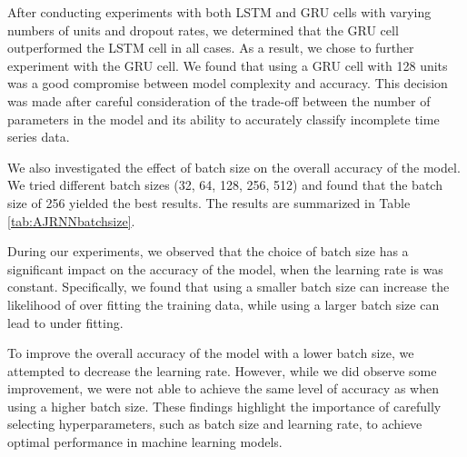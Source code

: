 After conducting experiments with both LSTM and GRU cells with varying numbers of units and dropout rates, we determined that the GRU cell outperformed the LSTM cell in all cases.
As a result, we chose to further experiment with the GRU cell. 
We found that using a GRU cell with 128 units was a good compromise between model complexity and accuracy. 
This decision was made after careful consideration of the trade-off between the number of parameters in the model and its ability to accurately classify incomplete time series data.

We also investigated the effect of batch size on the overall accuracy of the model.
We tried different batch sizes (32, 64, 128, 256, 512) and found that the batch size of 256 yielded the best results.
The results are summarized in Table \ref{tab:AJRNNbatchsize}.

During our experiments, we observed that the choice of batch size has a significant impact on the accuracy of the model, when the learning rate is was constant.
Specifically, we found that using a smaller batch size can increase the likelihood of over fitting the training data, while using a larger batch size can lead to under fitting.

To improve the overall accuracy of the model with a lower batch size, we attempted to decrease the learning rate.
However, while we did observe some improvement, we were not able to achieve the same level of accuracy as when using a higher batch size.
These findings highlight the importance of carefully selecting hyperparameters, such as batch size and learning rate, to achieve optimal performance in machine learning models.


